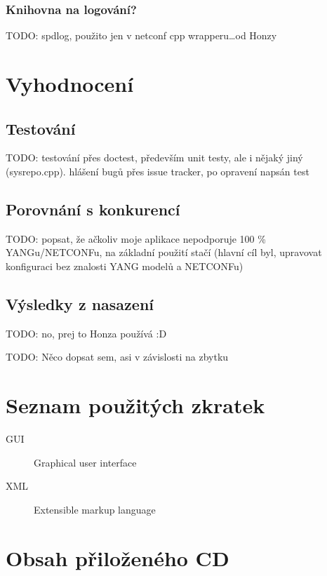 \documentclass[thesis=B,czech]{FITthesis}[2019/03/06]
\begin{document}
\subsection{Knihovna na logování?}
TODO: spdlog, použito jen v netconf cpp wrapperu\ldots od Honzy


\chapter{Vyhodnocení}
\section{Testování}
TODO: testování přes doctest, především unit testy, ale i nějaký jiný (sysrepo.cpp)\@. hlášení bugů přes issue tracker, po opravení napsán test
\section{Porovnání s konkurencí}
TODO: popsat, že ačkoliv moje aplikace nepodporuje 100 \% YANGu/NETCONFu, na základní použití stačí (hlavní cíl byl, upravovat konfiguraci bez znalosti YANG modelů a NETCONFu)
\section{Výsledky z nasazení}
TODO: no, prej to Honza používá :D

\begin{conclusion}
TODO: Něco dopsat sem, asi v závislosti na zbytku
\end{conclusion}




\appendix

\chapter{Seznam použitých zkratek}
\begin{description}
	\item[GUI] Graphical user interface
	\item[XML] Extensible markup language
\end{description}

\chapter{Obsah přiloženého CD}

\end{document}
